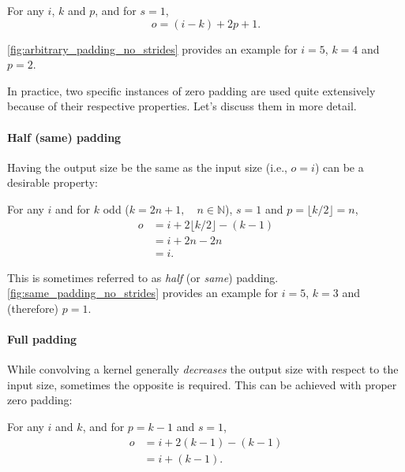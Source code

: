 \begin{relationship}\label{rel:arbitrary_padding_no_strides}
For any $i$, $k$ and $p$, and for $s = 1$,
\begin{equation*}
    o = (i - k) + 2p + 1.
\end{equation*}
\end{relationship}

\noindent \autoref{fig:arbitrary_padding_no_strides} provides an example for $i
= 5$, $k = 4$ and $p = 2$.

In practice, two specific instances of zero padding are used quite extensively
because of their respective properties. Let's discuss them in more detail.

\paragraph{Half (same) padding}

Having the output size be the same as the input size (i.e., $o = i$) can be a
desirable property:

\begin{relationship}\label{rel:same_padding_no_strides}
For any $i$ and for $k$ odd ($k = 2n + 1, \quad n \in \mathbb{N}$), $s = 1$ and
$p = \lfloor k / 2 \rfloor = n$,
\begin{equation*}
\begin{split}
    o &= i + 2 \lfloor k / 2 \rfloor - (k - 1) \\
      &= i + 2n - 2n \\
      &= i.
\end{split}
\end{equation*}
\end{relationship}

\noindent This is sometimes referred to as {\em half\/} (or {\em same\/})
padding. \autoref{fig:same_padding_no_strides} provides an example for
$i = 5$, $k = 3$ and (therefore) $p = 1$.

\paragraph{Full padding}

While convolving a kernel generally {\em decreases\/} the output size with
respect to the input size, sometimes the opposite is required. This can be
achieved with proper zero padding:

\begin{relationship}\label{rel:full_padding_no_strides}
For any $i$ and $k$, and for $p = k - 1$ and $s = 1$,
\begin{equation*}
\begin{split}
    o &= i + 2(k - 1) - (k - 1) \\
      &= i + (k - 1).
\end{split}
\end{equation*}
\end{relationship}


